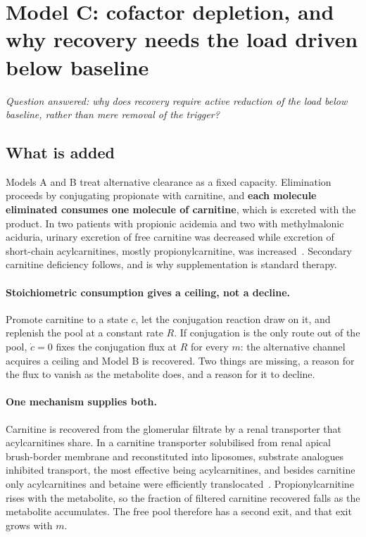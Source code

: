 \section{Model C: cofactor depletion, and why recovery needs the load driven below
         baseline}

\emph{Question answered: why does recovery require active reduction of the load below
baseline, rather than mere removal of the trigger?}

\subsection{What is added}
\label{sec:model_C_added}

Models A and B treat alternative clearance as a fixed capacity. Elimination proceeds by
conjugating propionate with carnitine, and \textbf{each molecule eliminated consumes one
molecule of carnitine}, which is excreted with the product. In two patients with propionic
acidemia and two with methylmalonic aciduria, urinary excretion of free carnitine was
decreased while excretion of short-chain acylcarnitines, mostly propionylcarnitine, was
increased~\cite{carnitine_excretion_pa}. %
Secondary carnitine deficiency follows, and is why supplementation is standard therapy.

\paragraph{Stoichiometric consumption gives a ceiling, not a decline.} Promote carnitine to
a state $c$, let the conjugation reaction draw on it, and replenish the pool at a constant
rate $R$. If conjugation is the only route out of the pool, $\dot c = 0$ fixes the
conjugation flux at $R$ for every $m$: the alternative channel acquires a ceiling and Model
B is recovered. Two things are missing, a reason for the flux to vanish as the metabolite
does, and a reason for it to decline.

\paragraph{One mechanism supplies both.} Carnitine is recovered from the glomerular filtrate
by a renal transporter that acylcarnitines share. In a carnitine transporter solubilised
from renal apical brush-border membrane and reconstituted into liposomes, substrate
analogues inhibited transport, the most effective being acylcarnitines, and besides
carnitine only acylcarnitines and betaine were efficiently
translocated~\cite{octn2_renal_transport}. %
Propionylcarnitine rises with the metabolite, so the fraction of filtered carnitine
recovered falls as the metabolite accumulates. The free pool therefore has a second exit,
and that exit grows with $m$.

